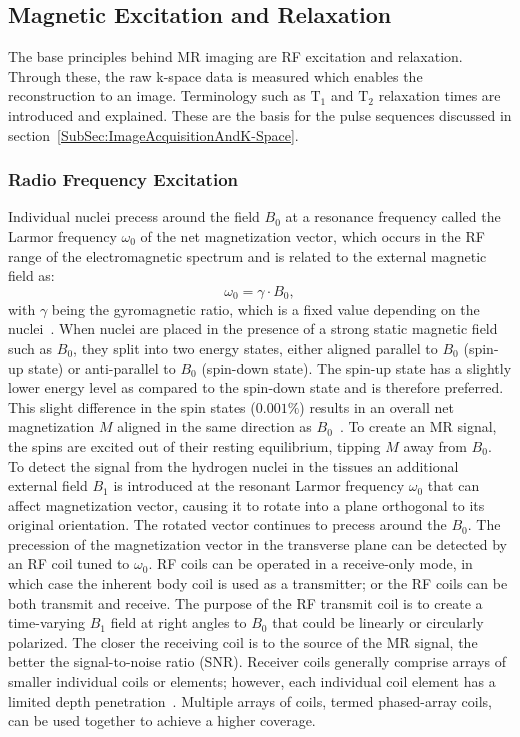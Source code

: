 \subsection{Magnetic Excitation and Relaxation} \label{SubSec:MagneticExcitationAndRelaxation}
The base principles behind MR imaging are RF excitation and relaxation. Through these, the raw k-space data is measured which enables the reconstruction to an image. Terminology such as $\text{T}_1$ and $\text{T}_2$ relaxation times are introduced and explained. These are the basis for the pulse sequences discussed in section~\ref{SubSec:ImageAcquisitionAndK-Space}.

\subsubsection{Radio Frequency Excitation}
Individual nuclei precess around the field $B_0$ at a
resonance frequency called the Larmor frequency $\omega_0$ of the net magnetization vector, which occurs in the RF range of the electromagnetic spectrum and is related to the external magnetic field as:
\begin{equation} \label{eq:LarmorFrequency}
	\omega_0 = \gamma \cdot B_0,
\end{equation}
with $\gamma$ being the gyromagnetic ratio, which is a fixed value depending on the nuclei~\cite{SamplingStrategies}. When nuclei are placed in the presence of a strong static magnetic field such as $B_0$, they split into two energy states, either aligned parallel to $B_0$ (spin-up state) or anti-parallel to $B_0$ (spin-down state). The spin-up state has a slightly lower energy level as compared to the spin-down state and is therefore preferred. This slight difference in the spin states ($0.001\%$) results in an overall net magnetization $M$ aligned in the same direction as $B_0$~\cite{Serai2021}. To create an MR signal, the spins are excited out of their resting equilibrium, tipping $M$ away from $B_0$. To detect the signal from the hydrogen nuclei in the tissues an additional external field $B_1$ is introduced at the resonant Larmor frequency $\omega_0$ that can affect magnetization vector, causing it to rotate into a plane orthogonal to its original orientation. The rotated vector continues to precess around the $B_0$. The precession of the magnetization vector in the transverse plane can be detected by an RF coil tuned to $\omega_0$. RF coils can be operated in a receive-only mode, in which case the inherent body coil is used as a transmitter; or the RF coils can be both transmit and receive. The purpose of the RF transmit coil is to create a time-varying $B_1$ field at right angles to $B_0$ that could be linearly or circularly polarized. The closer the receiving coil is to the source of the MR signal, the better the signal-to-noise ratio (SNR). Receiver coils generally comprise arrays of smaller individual coils or elements; however, each individual coil element has a limited depth penetration~\cite{Serai2021}. Multiple arrays of coils, termed phased-array coils, can be used together to achieve a higher coverage. 
